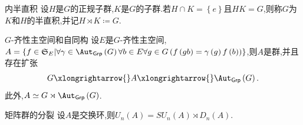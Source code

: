 \begin{definition}{内半直积}{}
	设$H$是$G$的正规子群,$K$是$G$的子群.若$H\cap K=\left\{e\right\}$且$HK=G$,则称$G$为$K$和$H$的半直积,并记$H\rtimes K\coloneq G$.
\end{definition}

\begin{example}{$G$-齐性主空间和自同构}{}
	设$E$是$G$-齐性主空间,$A=\left\{f\in\mathfrak{S}_{E}\middle|\forall\gamma\in\Aut_{\mathsf{Grp}}\left(G\right)\forall b\in E\forall g\in G\left(f\left(gb\right)=\gamma\left(g\right)f\left(b\right)\right)\right\}$,则$A$是群,并且存在扩张
	\begin{align*}
		G\xlongrightarrow{}A\xlongrightarrow{}\Aut_{\mathsf{Grp}}\left(G\right).
	\end{align*}
	此外,$A\simeq G\rtimes\Aut_{\mathsf{Grp}}\left(G\right)$.
\end{example}

\begin{example}{矩阵群的分裂}{}
	设$A$是交换环,则$U_{n}\left(A\right)=SU_{n}\left(A\right)\rtimes D_{n}\left(A\right)$.
\end{example}




































